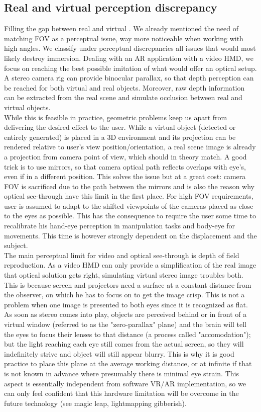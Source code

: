 \subsection{Real and virtual perception discrepancy}
Filling the gap between real and virtual . We already mentioned the need of matching FOV as a perceptual issue, way more noticeable when working with high angles. We classify under perceptual discrepancies all issues that would most likely destroy immersion. Dealing with an AR application with a video HMD, we focus on reaching the best possible imitation of what would offer an optical setup. A stereo camera rig can provide binocular parallax, so that depth perception can be reached for both virtual and real objects. Moreover, raw depth information can be extracted from the real scene and simulate occlusion between real and virtual objects.\\
While this is feasible in practice, geometric problems keep us apart from delivering the desired effect to the user. While a virtual object (detected or entirely generated) is placed in a 3D environment and its projection can be rendered relative to user's view position/orientation, a real scene image is already a projection from camera point of view, which should in theory match. A good trick is to use mirrors, so that camera optical path reflects overlaps with eye's, even if in a different position. This solves the issue but at a great cost: camera FOV is sacrificed due to the path between the mirrors and is also the reason why optical see-through have this limit in the first place. For high FOV requirements, user is assumed to adapt to the shifted viewpoints of the cameras placed as close to the eyes as possible. This has the consequence to require the user some time to recalibrate his hand-eye perception in manipulation tasks and body-eye for movements. This time is however strongly dependent on the displacement and the subject.\\
The main perceptual limit for video and optical see-through is depth of field reproduction. As a video HMD can only provide a simplification of the real image that optical solution gets right, simulating virtual stereo image troubles both. This is because screen and projectors need a surface at a constant distance from the observer, on which he has to focus on to get the image crisp. This is not a problem when one image is presented to both eyes since it is recognized as flat. As soon as stereo comes into play, objects are perceived behind or in front of a virtual window (referred to as the "zero-parallax" plane) and the brain will tell the eyes to focus their lenses to that distance (a process called "accomodation"); but the light reaching each eye still comes from the actual screen, so they will indefinitely strive and object will still appear blurry. This is why it is good practice to place this plane at the average working distance, or at infinite if that is not known in advance where presumably there is minimal eye strain. This aspect is essentially independent from software VR/AR implementation, so we can only feel confident that this hardware limitation will be overcome in the future technology (see magic leap, lightmapping gibberish).

